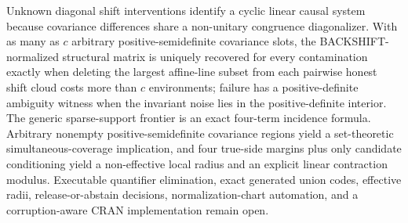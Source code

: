 Unknown diagonal shift interventions identify a cyclic linear causal system because covariance differences share a non-unitary congruence diagonalizer. With as many as \(c\) arbitrary positive-semidefinite covariance slots, the BACKSHIFT-normalized structural matrix is uniquely recovered for every contamination exactly when deleting the largest affine-line subset from each pairwise honest shift cloud costs more than \(c\) environments; failure has a positive-definite ambiguity witness when the invariant noise lies in the positive-definite interior. The generic sparse-support frontier is an exact four-term incidence formula. Arbitrary nonempty positive-semidefinite covariance regions yield a set-theoretic simultaneous-coverage implication, and four true-side margins plus only candidate conditioning yield a non-effective local radius and an explicit linear contraction modulus. Executable quantifier elimination, exact generated union codes, effective radii, release-or-abstain decisions, normalization-chart automation, and a corruption-aware CRAN implementation remain open.
